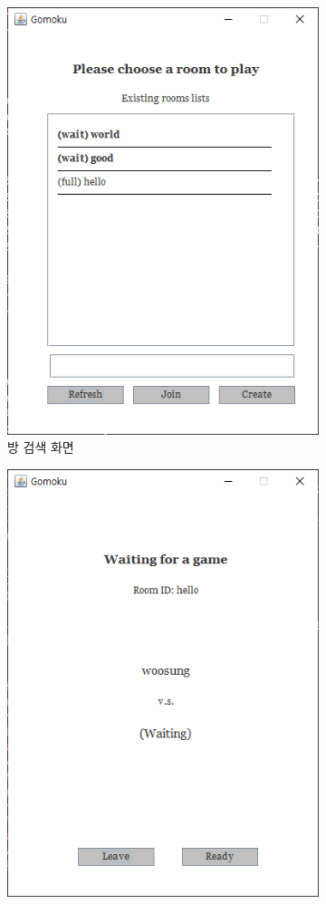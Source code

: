 \documentclass[a4paper, 10pt]{article}
\begin{document}
\begin{figure}[h]
\begin{subfigure}{.3\textwidth}
    \includegraphics[width=.9\linewidth]{resource/room_search}
    \caption{방 검색 화면}
    \label{fig:room_search}
  \end{subfigure}
  \begin{subfigure}{.3\textwidth}
    \centering
    \includegraphics[width=.9\linewidth]{resource/waiting}

\end{subfigure}
\end{figure}
\end{document}

